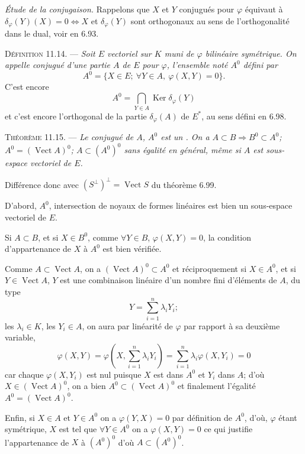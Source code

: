 \medskip\noindent\textit{Étude de la conjugaison.} Rappelons que $X$ et $Y$ conjugués pour $\varphi$ équivaut à $\delta_\varphi(Y)(X)=0\Longleftrightarrow X$ et $\delta_\varphi(Y)$ sont orthogonaux au sens de l'orthogonalité dans le dual, voir en 6.93.

\medskip\noindent\textsc{Définition 11.14.} --- \emph{Soit $E$ vectoriel sur $K$ muni de $\varphi$ bilinéaire symétrique. On appelle conjugué d'une partie $A$ de $E$ pour $\varphi$, l'ensemble noté $A^0$ défini par
\[
A^0=\{X\in E;\ \forall Y\in A,\ \varphi(X,Y)=0\}.
\]}
C'est encore
\[
A^0=\bigcap_{Y\in A}\operatorname{Ker}\delta_\varphi(Y)
\]
et c'est encore l'orthogonal de la partie $\delta_\varphi(A)$ de $E^*$, au sens défini en 6.98.

\medskip\noindent\textsc{Théorème 11.15.} --- \emph{Le conjugué de $A$, $A^0$ est un . On a $A\subset B\Rightarrow B^0\subset A^0$; $A^0=(\operatorname{Vect}A)^0$; $A\subset(A^0)^0$ sans égalité en général, même si $A$ est sous-espace vectoriel de $E$.}

Différence donc avec $(S^\perp)^\perp=\operatorname{Vect}S$ du théorème 6.99.

D'abord, $A^0$, intersection de noyaux de formes linéaires est bien un sous-espace vectoriel de $E$.

Si $A\subset B$, et si $X\in B^0$, comme $\forall Y\in B$, $\varphi(X,Y)=0$, la condition d'appartenance de $X$ à $A^0$ est bien vérifiée.

Comme $A\subset\operatorname{Vect}A$, on a $(\operatorname{Vect}A)^0\subset A^0$ et réciproquement si $X\in A^0$, et si $Y\in\operatorname{Vect}A$, $Y$ est une combinaison linéaire d'un nombre fini d'éléments de $A$, du type
\[
Y=\sum_{i=1}^n\lambda_iY_i;
\]
les $\lambda_i\in K$, les $Y_i\in A$, on aura par linéarité de $\varphi$ par rapport à sa deuxième variable,
\[
\varphi(X,Y)=\varphi\left(X,\sum_{i=1}^n\lambda_iY_i\right)=\sum_{i=1}^n\lambda_i\varphi(X,Y_i)=0
\]
car chaque $\varphi(X,Y_i)$ est nul puisque $X$ est dans $A^0$ et $Y_i$ dans $A$; d'où $X\in(\operatorname{Vect}A)^0$, on a bien $A^0\subset(\operatorname{Vect}A)^0$ et finalement l'égalité $A^0=(\operatorname{Vect}A)^0$.

Enfin, si $X\in A$ et $Y\in A^0$ on a $\varphi(Y,X)=0$ par définition de $A^0$, d'où, $\varphi$ étant symétrique, $X$ est tel que $\forall Y\in A^0$ on a $\varphi(X,Y)=0$ ce qui justifie l'appartenance de $X$ à $(A^0)^0$ d'où $A\subset(A^0)^0$. \bookend


